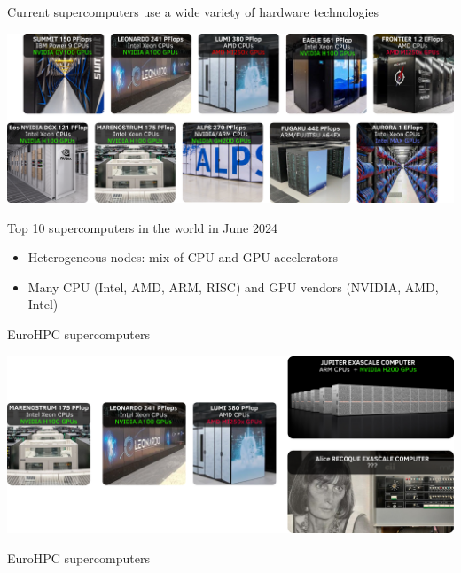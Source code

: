 \documentclass[aspectratio=169]{beamer}
\renewcommand{\caption}[1]{%
    \begin{center}
        \scriptsize #1
    \end{center}%
}
\begin{document}
\begin{frame}{Current supercomputers use a wide variety of hardware technologies}
    \begin{center}
        \includegraphics[width=1\textwidth]{top10_super_computers.png}

        \caption{Top 10 supercomputers in the world in June 2024}
    \end{center}
    \begin{itemize}
        \item Heterogeneous nodes: mix of CPU and GPU accelerators
        \item Many CPU (Intel, AMD, ARM, RISC) and GPU vendors (NVIDIA, AMD, Intel)
    \end{itemize}
\end{frame}


\begin{frame}{EuroHPC supercomputers}
    \begin{center}
        \includegraphics[width=1\textwidth]{euroHPC.png}

        \caption{EuroHPC supercomputers}
    \end{center}
\end{frame}

\end{document}
